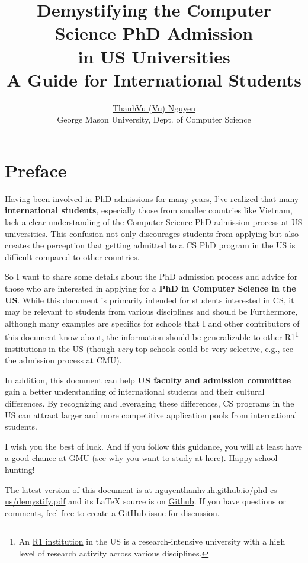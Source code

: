 \documentclass[oneside,11pt]{memoir}
\title{Demystifying the Computer Science PhD Admission\\in US Universities\\{\large A Guide for International Students}}
\author{\href{https://nguyenthanhvuh.github.io}{ThanhVu (Vu) Nguyen}\\{\small George Mason University, Dept. of Computer Science}}
\makeatletter
\def\maketitle{%
  \null
  \thispagestyle{empty}%
  \vfill
  \begin{center}\leavevmode
    \normalfont
    {\LARGE\raggedright \@title\par}%
    \vfill%
    {\Large \@author\par}%
    \vfill%
    {\large\raggedleft \@date\par}%
  \end{center}%
  \vfill
  \null
  \cleardoublepage
  }
\makeatother
\begin{document}
\maketitle
\frontmatter

\chapter{Preface}
Having been involved in PhD admissions for many years, I've
realized that many \textbf{international students}, especially those from smaller countries like Vietnam, lack a clear understanding of
the Computer Science PhD admission process at US universities. This confusion not only
discourages students from applying but also creates the perception that
getting admitted to a CS PhD program in the US is difficult compared to other countries.

So I want to share some details about the PhD admission process and advice for those who are interested in applying for a \textbf{PhD in Computer Science in the US}.
While this document is primarily intended for students interested in CS, it may be relevant to students from various disciplines and should be 
Furthermore, although many examples are specifics for schools that I and other contributors of this document know about, the information should be generalizable to other R1\footnote{An \href{https://en.wikipedia.org/wiki/List_of_research_universities_in_the_United_States}{R1 institution} in the US is a research-intensive university with a high level of research activity across various disciplines.} institutions in the US  (though \emph{very} top schools could be very selective, e.g., see the \href{https://da-data.blogspot.com/2015/03/reflecting-on-cs-graduate-admissions.html}{admission process} at CMU).

In addition, this document can help \textbf{US faculty and admission committee} gain a better understanding of international students and their cultural differences.  By recognizing and leveraging these differences, CS programs in the US can attract larger and more competitive application pools from international students.

I wish you the best of luck. And if you follow this guidance, you will at least have a good chance at GMU (see
\href{https://github.com/dynaroars/dynaroars.github.io/wiki/About-GMU}{why
you want to study at here}). Happy school hunting!

The latest version of this document is at \url{nguyenthanhvuh.github.io/phd-cs-us/demystify.pdf} and its \LaTeX{} source is on \href{https://github.com/nguyenthanhvuh/phd-cs-us}{Github}. If you have questions or comments, feel free to create a \href{https://github.com/nguyenthanhvuh/phd-cs-us/issues}{GitHub issue} for discussion.
\end{document}
